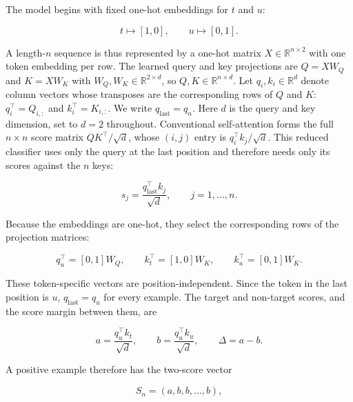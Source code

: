 \documentclass{article}
\begin{document}
The model begins with fixed one-hot embeddings for $t$ and $u$:

\begin{equation}
  t \mapsto [1,0],
  \qquad
  u \mapsto [0,1].
  \label{eq:token-embeddings}
\end{equation}

A length-$n$ sequence is thus represented by a one-hot matrix
$X\in\mathbb{R}^{n\times2}$ with one token embedding per row. The learned query
and key projections are $Q=XW_Q$ and $K=XW_K$ with
$W_Q,W_K\in\mathbb{R}^{2\times d}$, so $Q,K\in\mathbb{R}^{n\times d}$. Let
$q_i,k_i\in\mathbb{R}^d$ denote column vectors whose transposes are the
corresponding rows of $Q$ and $K$: $q_i^\top=Q_{i,:}$ and
$k_i^\top=K_{i,:}$. We write $q_{\mathrm{last}}=q_n$. Here $d$ is the query and
key dimension, set to $d=2$ throughout. Conventional self-attention forms the
full $n\times n$ score matrix $QK^\top/\sqrt{d}$, whose $(i,j)$ entry is
$q_i^\top k_j/\sqrt{d}$. This reduced classifier uses only the query at the last
position and therefore needs only its scores against the $n$ keys:

\begin{equation}
  s_j=\frac{q_{\mathrm{last}}^\top k_j}{\sqrt{d}},
  \qquad j=1,\ldots,n.
  \label{eq:reduced-score}
\end{equation}

Because the embeddings are one-hot, they select the corresponding rows of the
projection matrices:

\begin{equation}
  q_u^\top=[0,1]W_Q,
  \qquad
  k_t^\top=[1,0]W_K,
  \qquad
  k_u^\top=[0,1]W_K.
  \label{eq:token-query-keys}
\end{equation}

These token-specific vectors are position-independent. Since the token in the
last position is $u$, $q_{\mathrm{last}}=q_u$ for every example. The target and
non-target scores, and the score margin between them, are

\begin{equation}
  a=\frac{q_u^\top k_t}{\sqrt{d}},
  \qquad
  b=\frac{q_u^\top k_u}{\sqrt{d}},
  \qquad
  \Delta=a-b.
  \label{eq:target-nontarget-scores}
\end{equation}

A positive example therefore has the two-score vector

\begin{equation}
  S_n=(a,b,b,\ldots,b),
  \label{eq:two-score-structure}
\end{equation}
\end{document}
